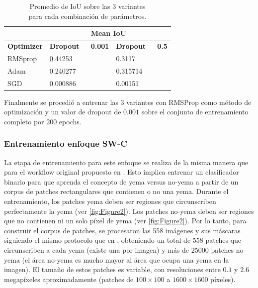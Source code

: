 \documentclass[a4paper,authoryear,review]{elsarticle}
\begin{document}
\begin{table}[]
	\centering
		\begin{tabular}{lll}
			\hline
			\multicolumn{1}{|l|}{} & \multicolumn{2}{c|}{\textbf{Mean IoU}} \\ \hline
			\multicolumn{1}{|c|}{\textbf{Optimizer}} & \multicolumn{1}{c|}{\textbf{Dropout = 0.001}} & \multicolumn{1}{c|}{\textbf{Dropout = 0.5}} \\ \hline
			RMSprop & {\ul 0.44253} & 0.3117 \\
			Adam & 0.240277 & 0.315714 \\
			SGD & 0.000886 & 0.00151 \\ \hline
	\end{tabular}%
	\caption{Promedio de IoU sobre las 3 variantes \\
		para cada combinación de parámetros.}
	\label{tab:TablaX}
\end{table}

Finalmente se procedió a entrenar las 3 variantes con RMSProp como método de optimización y un valor de dropout de $0.001$ sobre el conjunto de entrenamiento completo por 200 epochs.

\subsubsection{Entrenamiento enfoque SW-C} 
\label{sec:swtrain}


La etapa de entrenamiento para este enfoque se realiza de la misma manera que para el workflow original propuesto en \citet{perez2017image}. Esto implica entrenar un clasificador binario para que aprenda el concepto de yema versus no-yema a partir de un corpus de patches rectangulares que contienen o no una yema. Durante el entrenamiento, los patches yema deben ser regiones que circunscriben perfectamente la yema (ver \ref{fig:Figure2}). Los patches no-yema deben ser regiones que no contienen ni un solo píxel de yema (ver \ref{fig:Figure2}). Por lo tanto, para construir el corpus de patches, se procesaron las 558 imágenes y sus máscaras siguiendo el mismo protocolo que en \citet{perez2017image}, obteniendo un total de 558 patches que circunscriben a cada yema (existe una por imagen) y más de 25000 patches no-yema (el área no-yema es mucho mayor al área que ocupa una yema en la imagen). El tamaño de estos patches es variable, con resoluciones entre $0.1$ y $2.6$ megapíxeles aproximadamente (patches de $100 \times 100$ a $1600 \times 1600$ píxeles).
\end{document}
